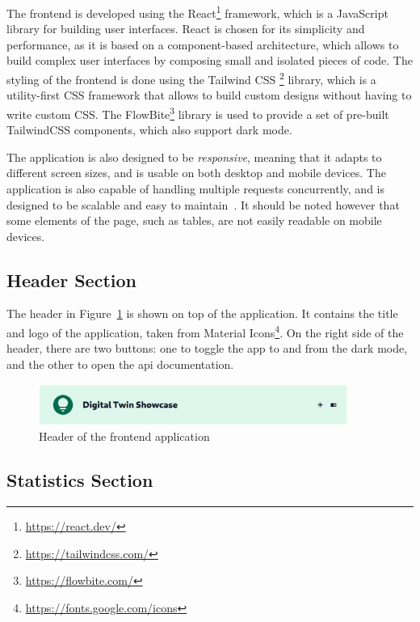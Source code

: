 The frontend is developed using the React\footnote{\url{https://react.dev/}} framework, which is a JavaScript library for building user interfaces. React is chosen for its simplicity and performance, as it is based on a component-based architecture, which allows to build complex user interfaces by composing small and isolated pieces of code. The styling of the frontend is done using the Tailwind CSS \footnote{\url{https://tailwindcss.com/}} library, which is a utility-first CSS framework that allows to build custom designs without having to write custom CSS. The FlowBite\footnote{\url{https://flowbite.com/}} library is used to provide a set of pre-built TailwindCSS components, which also support dark mode.

The application is also designed to be \textit{responsive}, meaning that it adapts to different screen sizes, and is usable on both desktop and mobile devices. The application is also capable of handling multiple requests concurrently, and is designed to be scalable and easy to maintain~\parencite{marcotteResponsiveWebDesign2010}. It should be noted however that some elements of the page, such as tables, are not easily readable on mobile devices.

\subsection{Header Section}

The header in Figure~\ref{fig:frontend_header} is shown on top of the application. It contains the title and logo of the application, taken from Material Icons\footnote{\url{https://fonts.google.com/icons}}. On the right side of the header, there are two buttons: one to toggle the app to and from the dark mode, and the other to open the \acrshort{api} documentation.

\begin{figure}
    \centering
    \includegraphics[width=0.9\textwidth]{images/frontend/header.png}
    \caption{Header of the frontend application}
    \label{fig:frontend_header}
\end{figure}

\subsection{Statistics Section}

